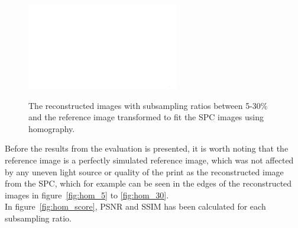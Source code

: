 \begin{figure}[H]
\begin{minipage}[t]{0.22\textwidth}
    \label{fig:hom_15}
    \includegraphics[width = \textwidth]{result/hom/im_m30.png}
    \label{fig:hom_30}
\end{minipage}
    \caption{The reconstructed images with subsampling ratios between 5-30\% and the reference image transformed to fit the SPC images using homography.}
    \label{fig:hom_over_im}
\end{figure}

Before the results from the evaluation is presented, it is worth noting that the reference image is a perfectly simulated reference image, which was not affected by any uneven light source or quality of the print as the reconstructed image from the SPC, which for example can be seen in the edges of the reconstructed images in figure~\ref{fig:hom_5} to \ref{fig:hom_30}.\\[0.1in] 

In figure~\ref{fig:hom_score}, PSNR and SSIM has been calculated for each subsampling ratio. 


